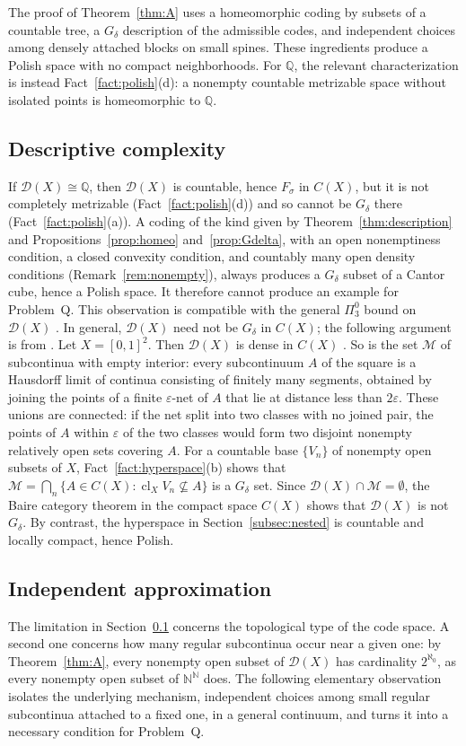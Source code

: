 \documentclass[11pt]{amsart}
\theoremstyle{definition}
\theoremstyle{remark}
\newcommand{\D}{\mathcal{D}}
\newcommand{\N}{\mathbb{N}}
\newcommand{\Q}{\mathbb{Q}}
\begin{document}
The proof of Theorem~\ref{thm:A} uses a homeomorphic coding by subsets of a countable tree, a $G_\delta$ description of the admissible codes, and independent choices among densely attached blocks on small spines. These ingredients produce a Polish space with no compact neighborhoods. For $\Q$, the relevant characterization is instead Fact~\ref{fact:polish}(d): a nonempty countable metrizable space without isolated points is homeomorphic to $\Q$.

\subsection{Descriptive complexity}\label{subsec:complexity}
If $\D(X)\cong\Q$, then $\D(X)$ is countable, hence $F_\sigma$ in $C(X)$, but it is not completely metrizable (Fact~\ref{fact:polish}(d)) and so cannot be $G_\delta$ there (Fact~\ref{fact:polish}(a)). A coding of the kind given by Theorem~\ref{thm:description} and Propositions~\ref{prop:homeo} and~\ref{prop:Gdelta}, with an open nonemptiness condition, a closed convexity condition, and countably many open density conditions (Remark~\ref{rem:nonempty}), always produces a $G_\delta$ subset of a Cantor cube, hence a Polish space. It therefore cannot produce an example for Problem~Q. This observation is compatible with the general $\Pi^0_3$ bound on $\D(X)$ \cite[Teorema~2.0.2]{Ra}. In general, $\D(X)$ need not be $G_\delta$ in $C(X)$; the following argument is from \cite[p.~23]{Ra}. Let $X=[0,1]^2$. Then $\D(X)$ is dense in $C(X)$ \cite[Theorem~3.6]{Or18}. So is the set $\mathcal M$ of subcontinua with empty interior: every subcontinuum $A$ of the square is a Hausdorff limit of continua consisting of finitely many segments, obtained by joining the points of a finite $\varepsilon$-net of $A$ that lie at distance less than $2\varepsilon$. These unions are connected: if the net split into two classes with no joined pair, the points of $A$ within $\varepsilon$ of the two classes would form two disjoint nonempty relatively open sets covering $A$. For a countable base $\{V_n\}$ of nonempty open subsets of $X$, Fact~\ref{fact:hyperspace}(b) shows that $\mathcal M=\bigcap_n\{A\in C(X): \operatorname{cl}_XV_n\not\subseteq A\}$ is a $G_\delta$ set. Since $\D(X)\cap\mathcal M=\emptyset$, the Baire category theorem in the compact space $C(X)$ shows that $\D(X)$ is not $G_\delta$. By contrast, the hyperspace in Section~\ref{subsec:nested} is countable and locally compact, hence Polish.

\subsection{Independent approximation}\label{subsec:independent}
The limitation in Section~\ref{subsec:complexity} concerns the topological type of the code space. A second one concerns how many regular subcontinua occur near a given one: by Theorem~\ref{thm:A}, every nonempty open subset of $\D(X)$ has cardinality $2^{\aleph_0}$, as every nonempty open subset of $\N^\N$ does. The following elementary observation isolates the underlying mechanism, independent choices among small regular subcontinua attached to a fixed one, in a general continuum, and turns it into a necessary condition for Problem~Q.
\end{document}
